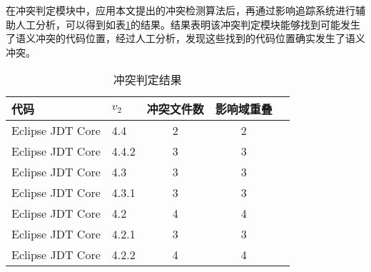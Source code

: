 在冲突判定模块中，应用本文提出的冲突检测算法后，再通过影响追踪系统进行辅助人工分析，可以得到如表\ref {data_compatible}的结果。结果表明该冲突判定模块能够找到可能发生了语义冲突的代码位置，经过人工分析，发现这些找到的代码位置确实发生了语义冲突。

\begin{table}[H]
	\caption{冲突判定结果}
	\label{data_compatible}
	\centering
	\begin{tabular}{llccc}
		\toprule[1.5pt]
		{\heiti 代码} & {\heiti $v_2$} & {\heiti 冲突文件数} & {\heiti 影响域重叠}  \\\midrule[1pt]
		Eclipse JDT Core & 4.4 	& 2 & 2 \\
		Eclipse JDT Core & 4.4.2 & 3 & 3 \\
		Eclipse JDT Core & 4.3 	& 3 & 3 \\
		Eclipse JDT Core & 4.3.1 & 3 & 3 \\
		Eclipse JDT Core & 4.2 	& 4 & 4 \\
		Eclipse JDT Core & 4.2.1 & 3  &	3 \\
		Eclipse JDT Core & 4.2.2 & 4 & 4 \\
		\bottomrule[1.5pt]
	\end{tabular}
\end{table}

%

